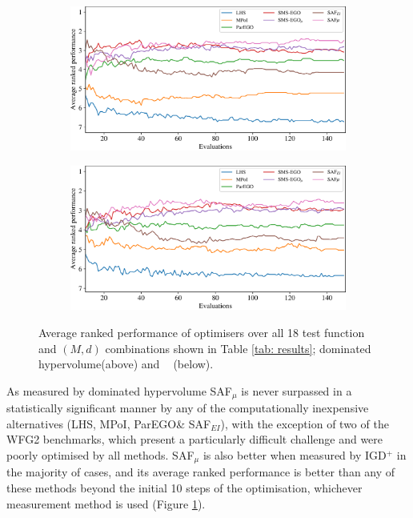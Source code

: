\documentclass[conference]{IEEEtran}
\newcommand{\ndim}{d}
\newcommand{\nobj}{M}
\DeclareMathOperator*{\igdp}{IGD^{+}}
\newcommand\hpv{dominated hypervolume\xspace}
\newcommand\safmu{SAF$_{\mu}$\xspace}
\newcommand\safei{SAF$_{EI}$\xspace}
\newcommand\parego{ParEGO\xspace}
\newcommand\mpoi{MPoI\xspace}
\newcommand\lhs{LHS\xspace}
\newcommand\igd{IGD$^+$\xspace}
\begin{document}
\begin{figure}[t]
\begin{subfigure}[b]{\columnwidth}
         \centering
         \includegraphics[width=0.85\columnwidth]{figures/_ranked_performance_plot_hv.pdf}
     \end{subfigure}
\begin{subfigure}[b]{\columnwidth}
         \centering
         \includegraphics[width=0.85\columnwidth]{figures/_ranked_performance_plot_igd.pdf}
     \end{subfigure}
\caption{Average ranked performance of optimisers over all 18 test
  function and $(\nobj,\ndim)$ combinations shown in Table \ref{tab:
    results};  \hpv (above) and $\igdp$ (below).}
\label{fig: ranked_plots}
\end{figure}

As measured by \hpv \safmu is never surpassed in a statistically significant manner by any of the computationally inexpensive alternatives (\lhs, \mpoi, \parego \& \safei), with the exception of two of the WFG2 benchmarks, which present a particularly difficult challenge and were poorly optimised by all methods. \safmu is also better when measured by \igd in the majority of cases, and its average ranked performance is  better than any of these methods beyond the initial 10 steps of the optimisation, whichever measurement method is used (Figure \ref{fig: ranked_plots}).  
\end{document}
